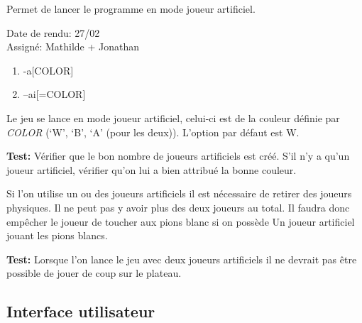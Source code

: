 \documentclass{article}
\begin{document}
\begin{needbox}[F23: Mode IA ]
    Permet de lancer le programme en mode joueur artificiel.
    \begin{duedatebox}
        Date de rendu: 27/02\\
        Assigné: Mathilde + Jonathan
    \end{duedatebox}
    \begin{subneedbox}
        \begin{enumerate}
            \item -a[COLOR]
            \item --ai[=COLOR]
        \end{enumerate}
        Le jeu se lance en mode joueur artificiel, celui-ci est de la couleur
        définie par \textit{COLOR} (`W', `B', `A' (pour les deux)). L'option 
        par défaut est W.

        \textbf{Test:} Vérifier que le bon nombre de joueurs artificiels est créé. 
        S'il n'y a qu'un joueur artificiel, vérifier qu'on lui a bien attribué la bonne
        couleur.
    \end{subneedbox}
    \begin{subneedbox}
        Si l'on utilise un ou des joueurs artificiels il est nécessaire de retirer
        des joueurs physiques. Il ne peut pas y avoir plus des deux joueurs au total.
        Il faudra donc empêcher le joueur de toucher aux pions blanc si on possède Un
        joueur artificiel jouant les pions blancs.

        \textbf{Test:} Lorsque l'on lance le jeu avec deux joueurs artificiels il ne 
        devrait pas être possible de jouer de coup sur le plateau.
    \end{subneedbox}
\end{needbox}

\subsection{Interface utilisateur}
\end{document}
